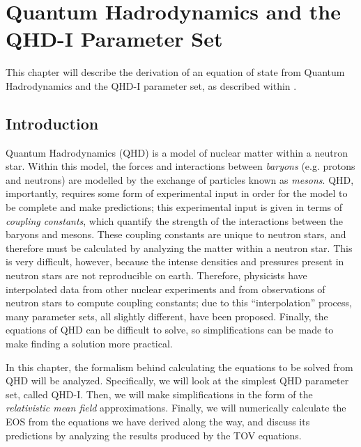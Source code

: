 \chapter{Quantum Hadrodynamics and the QHD-I Parameter Set}\label{ch: qhd1}

This chapter will describe the derivation of an equation of state from Quantum Hadrodynamics and the QHD-I parameter set, as described within \autocite{diener_2008}.

\section{Introduction}

Quantum Hadrodynamics (QHD) is a model of nuclear matter within a neutron star. Within this model, the forces and interactions between \textit{baryons} (e.g. protons and neutrons) are modelled by the exchange of particles known as \textit{mesons}. QHD, importantly, requires some form of experimental input in order for the model to be complete and make predictions; this experimental input is given in terms of \textit{coupling constants}, which quantify the strength of the interactions between the baryons and mesons. These coupling constants are unique to neutron stars, and therefore must be calculated by analyzing the matter within a neutron star. This is very difficult, however, because the intense densities and pressures present in neutron stars are not reproducible on earth. Therefore, physicists have interpolated data from other nuclear experiments and from observations of neutron stars to compute coupling constants; due to this ``interpolation'' process, many parameter sets, all slightly different, have been proposed. Finally, the equations of QHD can be difficult to solve, so simplifications can be made to make finding a solution more practical.

In this chapter, the formalism behind calculating the equations to be solved from QHD will be analyzed. Specifically, we will look at the simplest QHD parameter set, called QHD-I. Then, we will make simplifications in the form of the \textit{relativistic mean field} approximations. Finally, we will numerically calculate the EOS from the equations we have derived along the way, and discuss its predictions by analyzing the results produced by the TOV equations.


